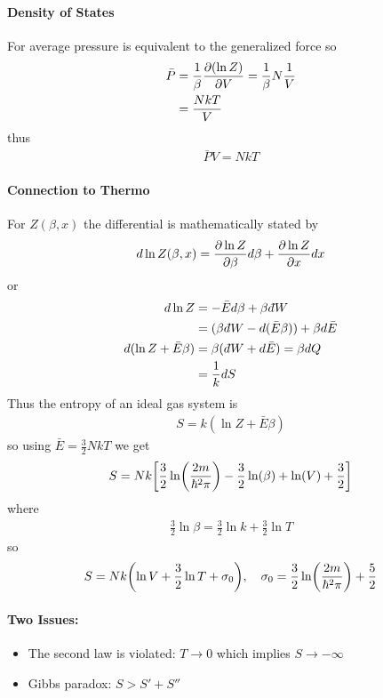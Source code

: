 \documentclass[../main.tex]{subfiles}
\begin{document}
\paragraph{Density of States} For average pressure is equivalent to the generalized force so
\begin{align*}
    \bar P &= \frac{1}{\beta} \pdv{(\ln Z)}{V} = \frac{1}{\beta} N \frac{1}{V} \\
    &= \frac{NkT}{V}
\end{align*}
thus
\begin{align*}
    \bar P V = NkT 
\end{align*}

\paragraph{Connection to Thermo} For $Z(\beta, x)$ the differential is mathematically stated by
\begin{align*}
    d\ln Z(\beta, x) = \pdv{\ln Z}{\beta} d\beta + \pdv{\ln Z}{x} dx 
\end{align*}
or 
\begin{align*}
    d \ln Z &= -\bar E d\beta + \beta d\hspace*{-0.08em}\bar{}\hspace*{0.1em} W \\
    &= (\beta d\hspace*{-0.08em}\bar{}\hspace*{0.1em} W - d(\bar E \beta)) + \beta d \bar E \\
    d(\ln Z + \bar E \beta) &= \beta(d\hspace*{-0.08em}\bar{}\hspace*{0.1em} W + d\bar E) = \beta dQ \\
    &= \frac{1}{k} dS
\end{align*}
Thus the entropy of an ideal gas system is
\begin{align*}
    S = k(\ln Z + \bar E \beta)
\end{align*}
so using $\bar E = \frac{3}{2} N kT$ we get
\begin{align*}
    S = Nk \qt[
        \frac{3}{2} \ln(\frac{2m}{\hbar^2\pi}) - \frac{3}{2} \ln(\beta) + \ln(V) + \frac{3}{2}
    ]
\end{align*}
where
\begin{align*}
    \frac{3}{2} \ln \beta = \frac{3}{2} \ln k + \frac{3}{2} \ln T
\end{align*}
so
\begin{align*}
    S = Nk \qt(
        \ln V + \frac{3}{2} \ln T + \sigma_0
    ), \quad \sigma_0 = \frac{3}{2} \ln(\frac{2m}{\hbar^2\pi}) + \frac{5}{2}
\end{align*}
\paragraph{Two Issues:}
\begin{itemize}
    \item The second law is violated: $T \to 0$ which implies $S \to -\infty$
    \item Gibbs paradox: $S > S' + S''$
\end{itemize}
\end{document}
